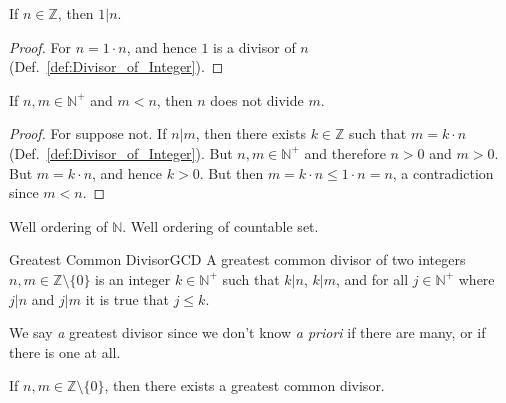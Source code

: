 \documentclass{article}                                                        %
\begin{document}
            \begin{theorem}
                \label{thm:One_is_Divisor}%
                If $n\in\mathbb{Z}$, then $1|n$.
            \end{theorem}
            \begin{proof}
                For $n=1\cdot{n}$, and hence $1$ is a divisor of $n$
                (Def.~\ref{def:Divisor_of_Integer}).
            \end{proof}
            \begin{theorem}
                \label{thm:Greater_is_not_divisor_of_lesser}%
                If $n,m\in\mathbb{N}^{+}$ and $m<n$, then $n$ does not divide
                $m$.
            \end{theorem}
            \begin{proof}
                For suppose not. If $n|m$, then there exists $k\in\mathbb{Z}$
                such that $m=k\cdot{n}$ (Def.~\ref{def:Divisor_of_Integer}). But
                $n,m\in\mathbb{N}^{+}$ and therefore $n>0$ and $m>0$. But
                $m=k\cdot{n}$, and hence $k>0$. But then
                $m=k\cdot{n}\leq{1}\cdot{n}=n$, a contradiction since $m<n$.
            \end{proof}
            Well ordering of $\mathbb{N}$. Well ordering of countable set.
            \begin{fdefinition}{Greatest Common Divisor}{GCD}
                A greatest common divisor of two integers
                $n,m\in\mathbb{Z}\setminus\{0\}$ is an integer
                $k\in\mathbb{N}^{+}$ such that $k|n$, $k|m$, and for all
                $j\in\mathbb{N}^{+}$ where $j|n$ and $j|m$ it is true that
                $j\leq{k}$.
            \end{fdefinition}
            We say \textit{a} greatest divisor since we don't know
            \textit{a priori} if there are many, or if there is one at all.
            \begin{theorem}
                \label{thm:GCD_Existence_Theorem}%
                If $n,m\in\mathbb{Z}\setminus\{0\}$, then there exists a
                greatest common divisor.
            \end{theorem}
\end{document}
